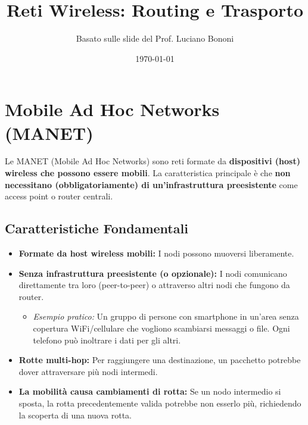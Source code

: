 


\title{Reti Wireless: Routing e Trasporto}
\author{Basato sulle slide del Prof. Luciano Bononi}
\date{\today}



\maketitle
\tableofcontents
\newpage

\section{Mobile Ad Hoc Networks (MANET)}

Le MANET (Mobile Ad Hoc Networks) sono reti formate da \textbf{dispositivi (host) wireless che possono essere mobili}. La caratteristica principale è che \textbf{non necessitano (obbligatoriamente) di un'infrastruttura preesistente} come access point o router centrali.

\subsection{Caratteristiche Fondamentali}
\begin{itemize}
    \item \textbf{Formate da host wireless mobili:} I nodi possono muoversi liberamente.
    \item \textbf{Senza infrastruttura preesistente (o opzionale):} I nodi comunicano direttamente tra loro (peer-to-peer) o attraverso altri nodi che fungono da router.
        \begin{itemize}
            \item \textit{Esempio pratico:} Un gruppo di persone con smartphone in un'area senza copertura WiFi/cellulare che vogliono scambiarsi messaggi o file. Ogni telefono può inoltrare i dati per gli altri.
        \end{itemize}
    \item \textbf{Rotte multi-hop:} Per raggiungere una destinazione, un pacchetto potrebbe dover attraversare più nodi intermedi.
    \item \textbf{La mobilità causa cambiamenti di rotta:} Se un nodo intermedio si sposta, la rotta precedentemente valida potrebbe non esserlo più, richiedendo la scoperta di una nuova rotta.
\end{itemize}

